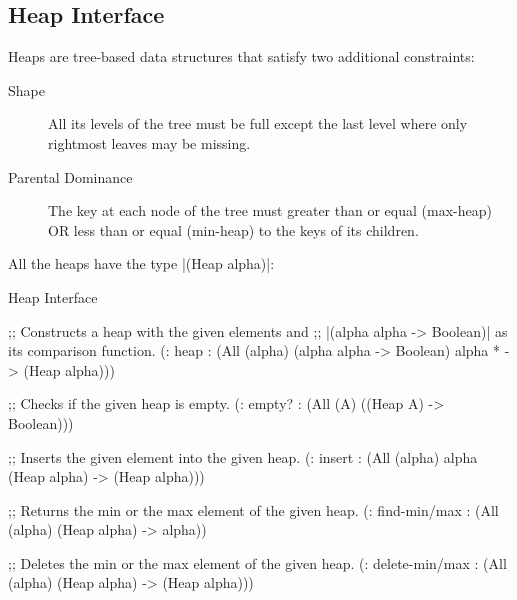 % 
% 
% 


\subsection{Heap Interface}

Heaps are tree-based data structures that satisfy two additional
constraints:

\begin{description}
\item[Shape] All its levels of the tree must be full
  except the last level where only rightmost leaves may be missing.
\item[Parental Dominance] The key at each node of the tree
  must greater than or equal (max-heap) OR less than or equal (min-heap)
  to the keys of its children.
\end{description}
\noindent
All the heaps have the type \scheme|(Heap alpha)|:

\begin{file}{Heap Interface}
  \begin{schemedisplay}

    ;; Constructs a heap with the given elements and 
    ;; \scheme|(alpha alpha -> Boolean)| as its comparison function.
    (: heap : (All (alpha) (alpha alpha -> Boolean) alpha * -> (Heap alpha)))


    ;; Checks if the given heap is empty.
    (: empty? : (All (A) ((Heap A) -> Boolean)))

    
    ;; Inserts the given element into the given heap.
    (: insert : (All (alpha) alpha (Heap alpha) -> (Heap alpha)))


    ;; Returns the min or the max element of the given heap.
    (: find-min/max : (All (alpha) (Heap alpha) -> alpha))


    ;; Deletes the min or the max element of the given heap.
    (: delete-min/max : (All (alpha) (Heap alpha) -> (Heap alpha)))

  \end{schemedisplay}
\end{file}
% 



